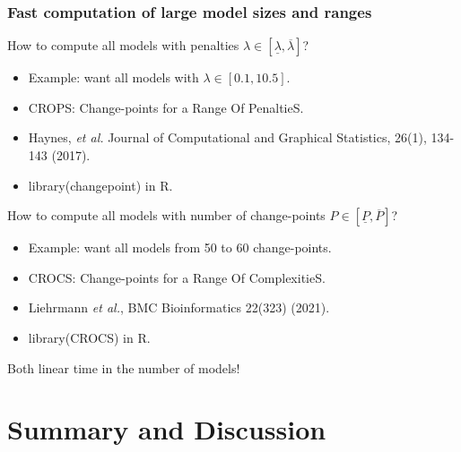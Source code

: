 \documentclass{beamer}
\begin{document}
\begin{frame}
  \frametitle{Fast computation of large model sizes and ranges}

  How to compute all models with penalties $\lambda\in[\underline \lambda, \overline \lambda]$?
  \begin{itemize}
  \item Example: want all models with $\lambda\in[0.1, 10.5]$.
  \item CROPS: Change-points for a Range Of PenaltieS.
  \item Haynes, \emph{et al.} Journal of Computational and Graphical Statistics, 26(1), 134-143 (2017).
  \item library(changepoint) in R.
  \end{itemize}
  
  How to compute all models with number of change-points $P\in[\underline P, \overline P]$?
  \begin{itemize}
  \item Example: want all models from 50 to 60 change-points.
  \item CROCS: Change-points for a Range Of ComplexitieS.
  \item Liehrmann \emph{et al.}, BMC Bioinformatics 22(323) (2021).
  \item library(CROCS) in R.
  \end{itemize}
  Both linear time in the number of models!
\end{frame}
 
\section{Summary and Discussion}
\end{document}
